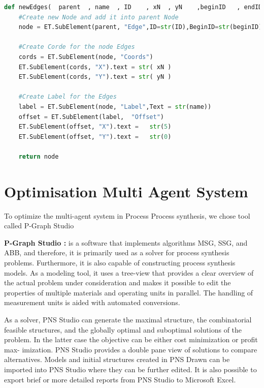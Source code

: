 \begin{lstlisting}[language=Python, caption=Python Function new Edges]
def newEdges(  parent  , name  , ID    , xN  , yN    ,beginID   , endID    ):
	#Create new Node and add it into parent Node	
	node = ET.SubElement(parent, "Edge",ID=str(ID),BeginID=str(beginID),EndID=str(endID),Rate=str(name),Title=str(name) , ArrowOnCenter="true" , ArrowPosition="50")  
	
	#Create Corde for the node Edges
	cords = ET.SubElement(node, "Coords")
	ET.SubElement(cords, "X").text = str( xN )
	ET.SubElement(cords, "Y").text = str( yN )
		 		 		  
	#Create Label for the Edges
	label = ET.SubElement(node, "Label",Text = str(name))
	offset = ET.SubElement(label,  "Offset")
	ET.SubElement(offset, "X").text =   str(5)
	ET.SubElement(offset, "Y").text =   str(0)
 
	return node 
\end{lstlisting}


\pagebreak
\section{ Optimisation Multi Agent System }

To optimize the multi-agent system in  Process Process synthesis, we chose tool called  P-Graph Studio 

\textbf{P-Graph Studio : }   is a software that implements algorithms MSG, SSG, and ABB, and therefore, it is primarily
used as a solver for process synthesis problems. Furthermore, it is also capable of constructing process synthesis models.
As a modeling tool, it uses a tree-view that provides a clear overview of the actual problem under consideration and makes
it possible to edit the properties of multiple materials and operating units in parallel. The handling of measurement units
is aided with automated conversions. \cite{ ch3-pgraph2 , Sitepgraph}

As a solver, PNS Studio can generate the maximal structure, the combinatorial feasible structures, and the globally optimal
and suboptimal solutions of the problem. In the latter case the objective can be either cost minimization or profit max-
imization. PNS Studio provides a double pane view of solutions to compare alternatives.
Models and initial structures created in PNS Drawn can be imported into PNS Studio where they can be further edited. It
is also possible to export brief or more detailed reports from PNS Studio to Microsoft Excel. \cite{ch3-pgraph}

